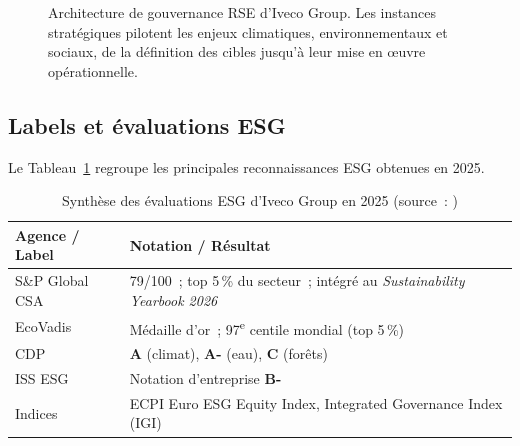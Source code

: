 \begin{figure}[htbp]
\centering
{}
\caption{Architecture de gouvernance RSE d'Iveco Group. Les instances stratégiques pilotent les enjeux climatiques, environnementaux et sociaux, de la définition des cibles jusqu'à leur mise en œuvre opérationnelle.}
\label{fig:gouvernance}
\end{figure}

\subsection{Labels et évaluations ESG}

Le Tableau~\ref{tab:esg} regroupe les principales reconnaissances ESG obtenues en 2025.

\begin{table}[ht]
\centering
\caption[Synthèse des évaluations ESG d'Iveco Group en 2025]{Synthèse des évaluations ESG d'Iveco Group en 2025 (source~: \cite{iveco_sustainability_inaction_2025})}
\label{tab:esg}
\footnotesize
\begin{tabularx}{\textwidth}{@{}lX@{}}
\toprule
\textbf{Agence / Label} & \textbf{Notation / Résultat} \\
\midrule
S\&P Global CSA & 79/100~; top 5\,\% du secteur~; intégré au \textit{Sustainability Yearbook 2026} \\
EcoVadis & Médaille d'or~; 97\textsuperscript{e} centile mondial (top 5\,\%) \\
CDP & \textbf{A} (climat), \textbf{A-} (eau), \textbf{C} (forêts) \\
ISS ESG & Notation d'entreprise \textbf{B-} \\
Indices & ECPI Euro ESG Equity Index, Integrated Governance Index (IGI) \\
\bottomrule
\end{tabularx}
\end{table}

